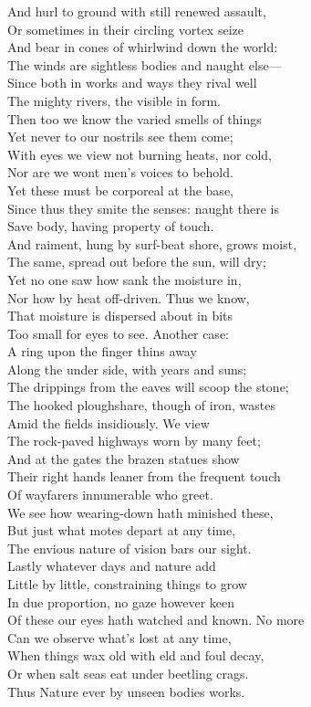 And hurl to ground with still renewed assault,\\
Or sometimes in their circling vortex seize\\
And bear in cones of whirlwind down the world:\\
The winds are sightless bodies and naught else—\\
Since both in works and ways they rival well\\
The mighty rivers, the visible in form.\\
Then too we know the varied smells of things\\
Yet never to our nostrils see them come;\\
With eyes we view not burning heats, nor cold,\\
Nor are we wont men's voices to behold.\\
Yet these must be corporeal at the base,\\
Since thus they smite the senses: naught there is\\
Save body, having property of touch.\\
And raiment, hung by surf-beat shore, grows moist,\\
The same, spread out before the sun, will dry;\\
Yet no one saw how sank the moisture in,\\
Nor how by heat off-driven. Thus we know,\\
That moisture is dispersed about in bits\\
Too small for eyes to see. Another case:\\
A ring upon the finger thins away\\
Along the under side, with years and suns;\\
The drippings from the eaves will scoop the stone;\\
The hooked ploughshare, though of iron, wastes\\
Amid the fields insidiously. We view\\
The rock-paved highways worn by many feet;\\
And at the gates the brazen statues show\\
Their right hands leaner from the frequent touch\\
Of wayfarers innumerable who greet.\\
We see how wearing-down hath minished these,\\
But just what motes depart at any time,\\
The envious nature of vision bars our sight.\\
Lastly whatever days and nature add\\
Little by little, constraining things to grow\\
In due proportion, no gaze however keen\\
Of these our eyes hath watched and known. No more\\
Can we observe what's lost at any time,\\
When things wax old with eld and foul decay,\\
Or when salt seas eat under beetling crags.\\
Thus Nature ever by unseen bodies works.

